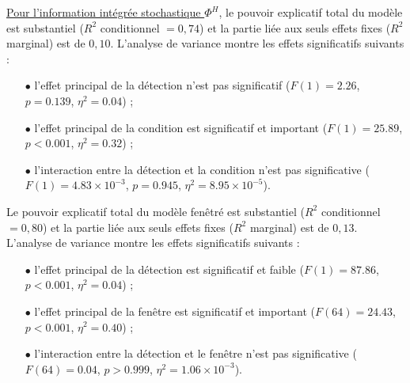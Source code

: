 \underline{Pour l'information intégrée stochastique $\Phi^{H}$}, le pouvoir explicatif total du modèle est substantiel ($R^2$ conditionnel $=0,74$) et la partie liée aux seuls effets fixes ($R^2$ marginal) est de $0,10$. 
L'analyse de variance montre les effets significatifs suivants : 
\begin{itemize}
\item[$\bullet$] l'effet principal de la détection n'est pas significatif ($F(1)=2.26$, $p=0.139$, $\eta^2=0.04$) ; 
\item[$\bullet$] l'effet principal de la condition est significatif et important ($F(1)=25.89$, $p<0.001$, $\eta^2=0.32$) ; 
\item[$\bullet$] l'interaction entre la détection et la condition n'est pas significative ($F(1)=4.83\times10^{-3}$, $p=0.945$, $\eta^2=8.95\times10^{-5}$). 
\end{itemize}
Le pouvoir explicatif total du modèle fenêtré est substantiel ($R^2$ conditionnel $=0,80$) et la partie liée aux seuls effets fixes ($R^2$ marginal) est de $0,13$. 
L'analyse de variance montre les effets significatifs suivants : 
\begin{itemize}
\item[$\bullet$] l'effet principal de la détection est significatif et faible ($F(1)=87.86$, $p<0.001$, $\eta^2=0.04$) ; 
\item[$\bullet$] l'effet principal de la fenêtre est significatif et important ($F(64)=24.43$, $p<0.001$, $\eta^2=0.40$) ; 
\item[$\bullet$] l'interaction entre la détection et le fenêtre n'est pas significative ($F(64)=0.04$, $p>0.999$, $\eta^2=1.06\times10^{-3}$). \\
\end{itemize}


